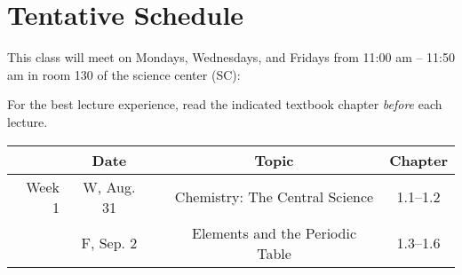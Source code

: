 \documentclass[12pt, letterpaper]{article}
\begin{document}
\section*{Tentative Schedule}
This class will meet on Mondays, Wednesdays, and Fridays from 11:00 am -- 11:50
am in room 130 of the science center (SC):

\noindent For the best lecture experience, read the indicated textbook chapter \emph{before} each lecture.

\noindent
\begin{tabular}{rcccc}
	       & Date       &  & Topic                           & Chapter  \\
	\midrule
	Week 1 & W, Aug. 31 &  & Chemistry: The Central Science  & 1.1--1.2 \\
	       & F, Sep. 2  &  & Elements and the Periodic Table & 1.3--1.6 \\
\end{tabular}
\end{document}
